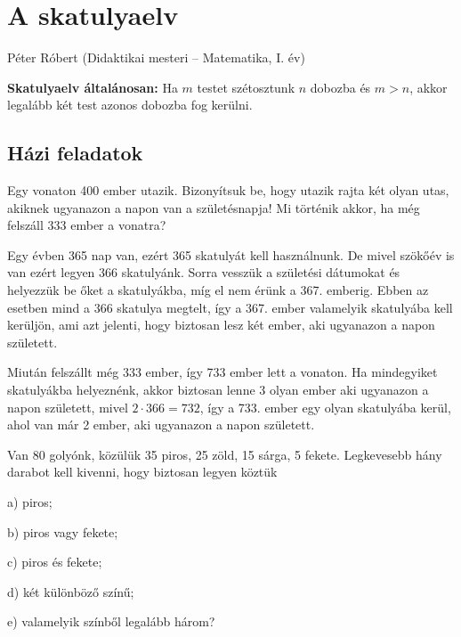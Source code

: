 \chapter{A skatulyaelv}\label{chap:skatulya}
\begin{description}
	{\large 
	\item [{Szerző:}] Péter Róbert (Didaktikai mesteri -- Matematika, I. év)
}
\end{description}
\textbf{Skatulyaelv általánosan: }Ha $m$ testet szétosztunk $n$ dobozba
és $m>n$, akkor legalább két test azonos dobozba fog kerülni. 

\section*{Házi feladatok}
\begin{problem}
	Egy vonaton 400 ember utazik. Bizonyítsuk be, hogy utazik rajta két
	olyan utas, akiknek ugyanazon a napon van a születésnapja! Mi történik
	akkor, ha még felszáll 333 ember a vonatra? \\
	
\end{problem}

\begin{solution}
	Egy évben 365 nap van, ezért 365 skatulyát kell használnunk. De mivel
	szökőév is van ezért legyen 366 skatulyánk. Sorra vesszük a születési
	dátumokat és helyezzük be őket a skatulyákba, míg el nem érünk a 367.
	emberig. Ebben az esetben mind a 366 skatulya megtelt, így a 367.
	ember valamelyik skatulyába kell kerüljön, ami azt jelenti, hogy biztosan
	lesz két ember, aki ugyanazon a napon született.
	
	Miután felszállt még 333 ember, így 733 ember lett a vonaton. Ha mindegyiket
	skatulyákba helyeznénk, akkor biztosan lenne 3 olyan ember aki ugyanazon
	a napon született, mivel $2\cdot366=732$, így a 733. ember egy olyan
	skatulyába kerül, ahol van már 2 ember, aki ugyanazon a napon született. 
\end{solution}
\begin{problem}
	Van 80 golyónk, közülük 35 piros, 25 zöld, 15 sárga, 5 fekete. Legkevesebb
	hány darabot kell kivenni, hogy biztosan legyen köztük 
	
	\item a) piros; 
	
	\item b) piros vagy fekete; 
	
	\item c) piros és fekete; 
	
	\item d) két különböző színű; 
	
	\item e) valamelyik színből legalább három? \\
	
\end{problem}

